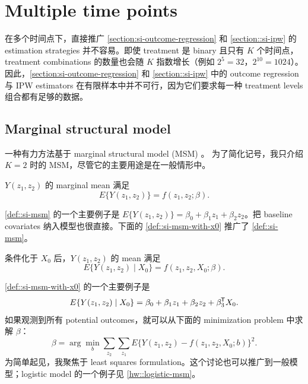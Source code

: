  
 
  
 
 
 
 

\section{Multiple time points}


在多个时间点下，直接推广 \cref{section:si-outcome-regression} 和 \cref{section::si-ipw} 的 estimation strategies 并不容易。即使 treatment 是 binary 且只有 $K$ 个时间点，treatment combinations 的数量也会随 $K$ 指数增长（例如 $2^5 = 32$，$2^{10} = 1024$）。因此，\cref{section:si-outcome-regression} 和 \cref{section::si-ipw} 中的 outcome regression 与 IPW estimators 在有限样本中并不可行，因为它们要求每一种 treatment levels 组合都有足够的数据。


\subsection{Marginal structural model}

一种有力方法基于 marginal structural model (MSM) \citep{robins2000marginal, hernan2000marginal}。
为了简化记号，我只介绍 $K=2$ 时的 MSM，尽管它的主要用途是在一般情形中。

\begin{definition}
[MSM]
\label{def::si-msm}
$Y(z_1, z_2)$ 的 marginal mean 满足
$$
E\{  Y(z_1, z_2) \} = f(z_1,z_2; \beta). 
$$
\end{definition}


\cref{def::si-msm} 的一个主要例子是 $E\{  Y(z_1, z_2) \} = \beta_0 + \beta_1 z_1 + \beta_2 z_2$。把 baseline covariates 纳入模型也很直接。下面的 \cref{def::si-msm-with-x0} 推广了 \cref{def::si-msm}。

 \begin{definition}
\label{def::si-msm-with-x0}
条件化于 $X_0$ 后，$Y(z_1, z_2)$ 的 mean 满足
$$
E\{  Y(z_1, z_2) \mid X_0 \} = f(z_1,z_2, X_0; \beta). 
$$
\end{definition}

\cref{def::si-msm-with-x0} 的一个主要例子是
\begin{equation}\label{eq::linear-msm}
E\{  Y(z_1, z_2)  \mid X_0\} = \beta_0 + \beta_1 z_1 + \beta_2 z_2 + \beta_3^{\mkern-1.5mu\mathsf{T}} X_0 .
\end{equation}
如果观测到所有 potential outcomes，就可以从下面的 minimization problem 中求解 $\beta$：
\begin{equation}
\label{eq::beta-ols-msm}
\beta = \arg\min_b \sum_{z_2}\sum_{z_1}  E \{  Y(z_1, z_2) -  f(z_1,z_2, X_0; b)   \}^2 .
\end{equation}
为简单起见，我聚焦于 least squares formulation。这个讨论也可以推广到一般模型；logistic model 的一个例子见 \cref{hw::logistic-msm}。



